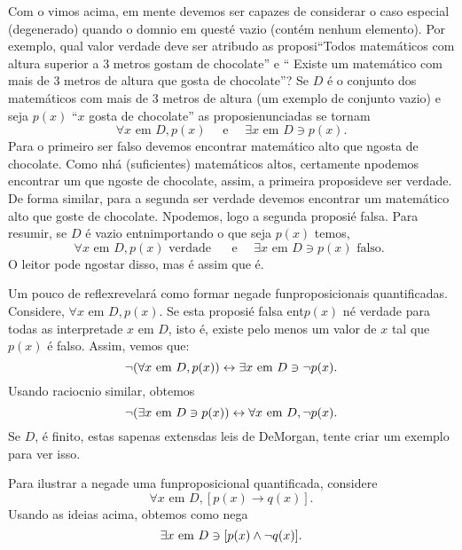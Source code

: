 Com o vimos acima, em mente devemos ser capazes de considerar o caso especial (degenerado) quando o dom\ih nio em quest\ao \'e vazio (cont\'em nenhum elemento). Por exemplo, qual valor verdade deve ser atribu\ih do as proposi\coes ``Todos matem\'aticos com altura superior a 3 metros gostam de chocolate'' e `` Existe um matem\'atico com mais de 3 metros de altura que gosta de chocolate''? Se $D$ \'e o conjunto dos matem\'aticos com mais de 3 metros de altura (um exemplo de conjunto vazio) e seja $p(x)$ ``$x$ gosta de chocolate'' as proposi\coes enunciadas se tornam 
\[
\forall x \textrm{ em } D, p(x) \quad \textrm{ e } \quad \exists x \textrm{ em } D \ni p(x).
\]
Para o primeiro ser falso devemos encontrar matem\'atico alto que n\ao gosta de chocolate. Como n\ao h\'a (suficientes) matem\'aticos altos, certamente n\ao podemos encontrar um que n\ao goste de chocolate, assim, a primeira proposi\cao deve ser verdade. De forma similar, para a segunda ser verdade devemos encontrar um matem\'atico alto que goste de chocolate. N\ao podemos, logo a segunda proposi\cao \'e falsa. Para resumir, se $D$ \'e vazio ent\ao n\ao importando o que seja $p(x)$ temos,
\[
\forall x \textrm{ em } D, p(x) \textrm{ verdade } \quad \textrm{ e } \quad \exists x \textrm{ em } D \ni p(x) \textrm{ falso. }
\]
O leitor pode n\ao gostar disso, mas \'e assim que \'e.

Um pouco de reflex\ao revelar\'a como formar nega\coes de fun\coes proposicionais quantificadas. Considere, $\forall x \textrm{ em } D, p(x)$. Se esta proposi\cao \'e falsa ent\ao $p(x)$ n\ao \'e verdade para todas as interpreta\coes de $x$ em $D$, isto \'e, existe pelo menos um valor de $x$ tal que $p(x)$ \'e falso. Assim, vemos que:
\[
\lnot(\forall x \textrm{ em } D, p(x))\leftrightarrow \exists x \textrm{ em } D \ni \lnot p(x).
\]
Usando racioc\ih nio similar, obtemos 
\[
\lnot(\exists x \textrm{ em } D \ni p(x))\leftrightarrow \forall x \textrm{ em } D, \lnot p(x).
\]
Se $D$, \'e finito, estas s\ao apenas extens\oes das leis de DeMorgan, tente criar um exemplo para ver isso.

Para ilustrar a nega\cao de uma fun\cao proposicional quantificada, considere
\[
\forall x \textrm{ em } D, [p(x)\to q(x)].
\]
Usando as ideias acima, obtemos como nega\cao
\[
\exists x \textrm{ em } D \ni [p(x) \wedge \lnot q(x)].
\]

